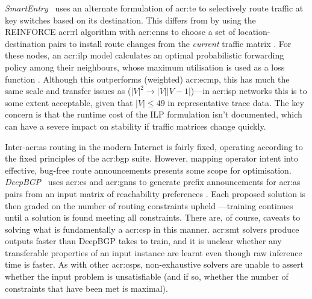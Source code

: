 \emph{SmartEntry}\littrace~\parencite{DBLP:conf/sigcomm/00010YC20} uses an alternate formulation of \gls{acr:te} to selectively route traffic at key switches based on its destination.
This differs from \citeauthor{DBLP:conf/hotnets/ValadarskySST17} by using the REINFORCE \gls{acr:rl} algorithm with \glspl{acr:cnn} to choose a set of location-destination pairs to install route changes \prllitact{} from the \emph{current} traffic matrix \prllitstate.
For these nodes, an \gls{acr:ilp} model calculates an optimal probabilistic forwarding policy among their neighbours, whose maximum utilisation is used as a loss function \prllitreward.
Although this outperforms (weighted) \gls{acr:ecmp}, this has much the same scale and transfer issues as \citeauthor{DBLP:conf/hotnets/ValadarskySST17} ($|V|^2\rightarrow|V||V-1|$)---in \gls{acr:isp} networks this is to some extent acceptable, given that $|V|\leq49$ in representative trace data.
The key concern is that the runtime cost of the ILP formulation isn't documented, which can have a severe impact on stability if traffic matrices change quickly.

Inter-\gls{acr:as} routing in the modern Internet is fairly fixed, operating according to the fixed principles of the \gls{acr:bgp} suite.
However, mapping operator intent into effective, bug-free route announcements presents some scope for optimisation.
\emph{DeepBGP}~\parencite{DBLP:conf/sigcomm/BahnasyLXC20} uses \gls{acr:es} and \glspl{acr:gnn} to generate prefix announcements for \gls{acr:as} pairs \prllitact{} from an input matrix of reachability preferences \prllitstate{}.
Each proposed solution is then graded on the number of routing constraints upheld \prllitreward{}---training continues until a solution is found meeting all constraints.
There are, of course, caveats to solving what is fundamentally a \gls{acr:csp} in this manner.
\gls{acr:smt} solvers produce outputs faster than DeepBGP takes to train, and it is unclear whether any transferable properties of an input instance are learnt even though raw inference time is faster.
As with other \glspl{acr:csp}, non-exhaustive solvers are unable to assert whether the input problem is unsatisfiable (and if so, whether the number of constraints that have been met is maximal).

